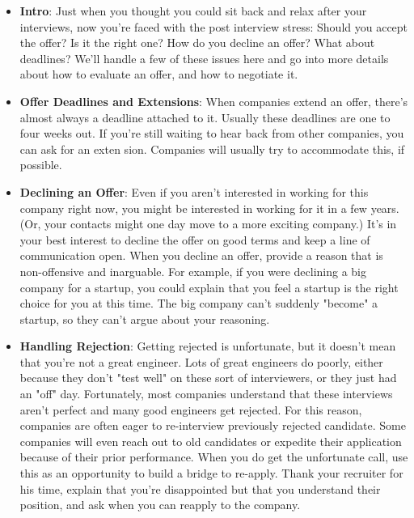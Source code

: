 \documentclass{report}
\begin{document}
    \pagebreak 
    \begin{itemize}
        \item \textbf{Intro}: Just when you thought you could sit back and relax after your interviews, now you're faced with the post interview stress: Should you accept the offer? Is it the right one? How do you decline an offer? What about deadlines? We'll handle a few of these issues here and go into more details about how to evaluate an offer, and how to negotiate it. 
        \item \textbf{Offer Deadlines and Extensions}: When companies extend an offer, there's almost always a deadline attached to it. Usually these deadlines are one to four weeks out. If you're still waiting to hear back from other companies, you can ask for an exten sion. Companies will usually try to accommodate this, if possible.
        \item \textbf{Declining an Offer}: Even if you aren't interested in working for this company right now, you might be interested in working for it in a few years. (Or, your contacts might one day move to a more exciting company.) It's in your best interest to decline the offer on good terms and keep a line of communication open.
            \bigbreak \noindent 
            When you decline an offer, provide a reason that is non-offensive and inarguable. For example, if you were declining a big company for a startup, you could explain that you feel a startup is the right choice for you at this time. The big company can't suddenly "become" a startup, so they can't argue about your reasoning.
        \item \textbf{Handling Rejection}: Getting rejected is unfortunate, but it doesn't mean that you're not a great engineer. Lots of great engineers do poorly, either because they don't "test well" on these sort of interviewers, or they just had an "off" day.
            \bigbreak \noindent 
            Fortunately, most companies understand that these interviews aren't perfect and many good engineers get rejected. For this reason, companies are often eager to re-interview previously rejected candidate. Some companies will even reach out to old candidates or expedite their application because of their prior performance.
            \bigbreak \noindent 
            When you do get the unfortunate call, use this as an opportunity to build a bridge to re-apply. Thank your recruiter for his time, explain that you're disappointed but that you understand their position, and ask when you can reapply to the company.

\end{itemize}
\end{document}
